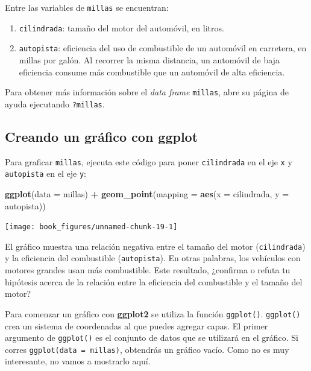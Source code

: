 \documentclass[11pt,oneside]{report}
\newenvironment{Shaded}{\begin{snugshade}}{\end{snugshade}}
\newcommand{\DataTypeTok}[1]{\textcolor[rgb]{0.13,0.29,0.53}{#1}}
\newcommand{\KeywordTok}[1]{\textcolor[rgb]{0.13,0.29,0.53}{\textbf{#1}}}
\newcommand{\NormalTok}[1]{#1}
\newcommand{\OperatorTok}[1]{\textcolor[rgb]{0.81,0.36,0.00}{\textbf{#1}}}
\newcommand{\StringTok}[1]{\textcolor[rgb]{0.31,0.60,0.02}{#1}}
\begin{document}
Entre las variables de \texttt{millas} se encuentran:

\begin{enumerate}
\def\labelenumi{\arabic{enumi}.}
\item
  \texttt{cilindrada}: tamaño del motor del automóvil, en litros.
\item
  \texttt{autopista}: eficiencia del uso de combustible de un automóvil
  en carretera, en millas por galón. Al recorrer la misma distancia, un
  automóvil de baja eficiencia consume más combustible que un automóvil
  de alta eficiencia.
\end{enumerate}

Para obtener más información sobre el \emph{data frame} \texttt{millas},
abre su página de ayuda ejecutando \texttt{?millas}.

\hypertarget{creando-un-gruxe1fico-con-ggplot}{%
\subsection{Creando un gráfico con
ggplot}\label{creando-un-gruxe1fico-con-ggplot}}

Para graficar \texttt{millas}, ejecuta este código para poner
\texttt{cilindrada} en el eje \texttt{x} y \texttt{autopista} en el eje
\texttt{y}:

\begin{Shaded}
\begin{Highlighting}[]
\KeywordTok{ggplot}\NormalTok{(}\DataTypeTok{data =}\NormalTok{ millas) }\OperatorTok{+}
\StringTok{  }\KeywordTok{geom_point}\NormalTok{(}\DataTypeTok{mapping =} \KeywordTok{aes}\NormalTok{(}\DataTypeTok{x =}\NormalTok{ cilindrada, }\DataTypeTok{y =}\NormalTok{ autopista))}
\end{Highlighting}
\end{Shaded}

\begin{center}\texttt{[image: book\_figures/unnamed-chunk-19-1]} \end{center}

El gráfico muestra una relación negativa entre el tamaño del motor
(\texttt{cilindrada}) y la eficiencia del combustible
(\texttt{autopista}). En otras palabras, los vehículos con motores
grandes usan más combustible. Este resultado, ¿confirma o refuta tu
hipótesis acerca de la relación entre la eficiencia del combustible y el
tamaño del motor?

Para comenzar un gráfico con \textbf{ggplot2} se utiliza la función
\texttt{ggplot()}. \texttt{ggplot()} crea un sistema de coordenadas al
que puedes agregar capas. El primer argumento de \texttt{ggplot()} es el
conjunto de datos que se utilizará en el gráfico. Si corres
\texttt{ggplot(data\ =\ millas)}, obtendrás un gráfico vacío. Como no es
muy interesante, no vamos a mostrarlo aquí.
\end{document}

